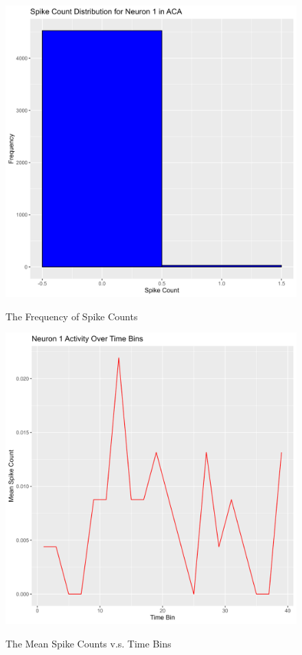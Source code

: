 \documentclass{article}
\begin{document}
	\begin{figure}[htbp]
		\centering
		\begin{minipage}[t]{0.48\textwidth}
			\centering
			\includegraphics[scale=0.3]{Pics/008}\label{fig:1.8}
			\caption{The Frequency of Spike Counts}
		\end{minipage}
		\begin{minipage}[t]{0.48\textwidth}
			\centering
			\includegraphics[scale=0.3]{Pics/009}\label{fig:1.9}
			\caption{The Mean Spike Counts v.s. Time Bins}
		\end{minipage}
	\end{figure}
\end{document}
